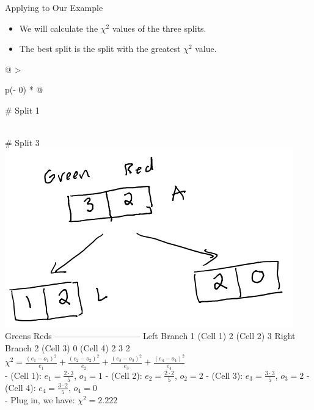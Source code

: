 \documentclass[
  ignorenonframetext,
]{beamer}
\providecommand{\tightlist}{%
  \setlength{\itemsep}{0pt}\setlength{\parskip}{0pt}}
\begin{document}
\begin{frame}{Applying to Our Example}
\protect\hypertarget{applying-to-our-example}{}
\begin{itemize}
\tightlist
\item
  We will calculate the \(\chi^2\) values of the three splits.\\
\item
  The best split is the split with the greatest \(\chi^2\) value.
\end{itemize}

\begin{longtable}[]{@{}
  >{\raggedright\arraybackslash}p{(\columnwidth - 0\tabcolsep) * }@{}}
\toprule
\begin{minipage}[b]{\linewidth}\raggedright
\# Split 1
\end{minipage} \\
\midrule
\endhead
\# Split 3 \\
\includegraphics{images/im2.png} \\
\textbar{} \textbar{} Greens \textbar{} Reds \textbar{} \textbar{}
\textbar--------------\textbar--------\textbar------\textbar---\textbar{}
\textbar{} Left Branch \textbar{} 1 (Cell 1) \textbar{} 2 (Cell 2)
\textbar{} 3 \textbar{} \textbar{} Right Branch \textbar{} 2 (Cell 3)
\textbar{} 0 (Cell 4) \textbar{} 2 \textbar{} \textbar{} \textbar{} 3
\textbar{} 2 \textbar{} \textbar{} \\
\(\chi^2 = \frac{(e_1-o_1)^2}{e_1}+\frac{(e_2-o_2)^2}{e_2}+\frac{(e_3-o_3)^2}{e_3}+\frac{(e_4-o_4)^2}{e_4}\) \\
- (Cell 1): \(e_1 = \frac{2\cdot 3}{5}\), \(o_1 = 1\) - (Cell 2):
\(e_2 = \frac{2\cdot 2}{5}\), \(o_2 = 2\) - (Cell 3):
\(e_3 = \frac{3\cdot 3}{5}\), \(o_3 = 2\) - (Cell 4):
\(e_4 = \frac{3\cdot 2}{5}\), \(o_4 = 0\) \\
- Plug in, we have: \(\chi^2 = 2.222\) \\
\bottomrule
\end{longtable}
\end{frame}
\end{document}
